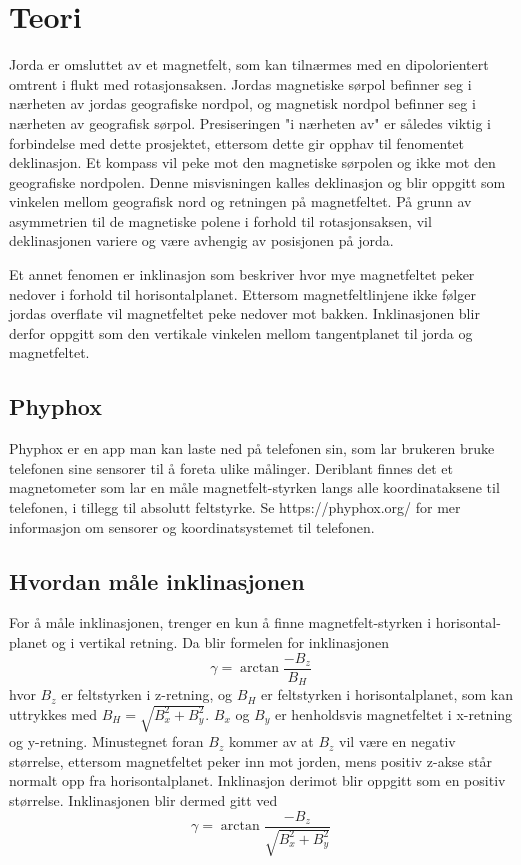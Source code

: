 \section{Teori}
Jorda er omsluttet av et magnetfelt, som kan tilnærmes med en 
dipolorientert omtrent i flukt med rotasjonsaksen. Jordas magnetiske sørpol 
befinner seg i nærheten av jordas geografiske nordpol, og magnetisk nordpol 
befinner seg i nærheten av geografisk sørpol. Presiseringen "i nærheten av" 
er således viktig i forbindelse med dette prosjektet, ettersom dette gir 
opphav til fenomentet deklinasjon. Et kompass vil peke mot den magnetiske sørpolen og ikke mot den geografiske nordpolen.
Denne misvisningen kalles deklinasjon og blir oppgitt som vinkelen mellom 
geografisk nord og retningen på magnetfeltet. På grunn av asymmetrien til 
de magnetiske polene i forhold til rotasjonsaksen, vil deklinasjonen 
variere og være avhengig av posisjonen på jorda. \cite{World_magnetic_model}

Et annet fenomen er inklinasjon som beskriver hvor mye magnetfeltet peker 
nedover i forhold til horisontalplanet. Ettersom magnetfeltlinjene ikke følger jordas overflate vil 
magnetfeltet peke nedover mot bakken. Inklinasjonen 
blir derfor oppgitt som den vertikale vinkelen mellom tangentplanet til jorda og
magnetfeltet.

\subsection{Phyphox}
Phyphox er en app man kan laste ned på telefonen sin, som lar brukeren 
bruke telefonen sine sensorer til å foreta ulike målinger. Deriblant finnes 
det et magnetometer som lar en måle magnetfelt-styrken langs alle 
koordinataksene til telefonen, i tillegg til absolutt feltstyrke. 
Se https://phyphox.org/ \cite{phyphox} for mer informasjon om sensorer og koordinatsystemet til telefonen.

\subsection{Hvordan måle inklinasjonen}
For å måle inklinasjonen, trenger en kun å finne magnetfelt-styrken i horisontal-
planet og i vertikal retning. Da blir formelen for inklinasjonen 
\begin{equation}
    \gamma = \arctan \frac{-B_z}{B_H} 
\end{equation}
hvor $B_z$ er feltstyrken i z-retning, og $B_H$ er feltstyrken i horisontalplanet, som kan 
uttrykkes med $B_H = \sqrt{B_x^2 + B_y^2}$. $B_x$ og $B_y$ er henholdsvis magnetfeltet i x-retning
og y-retning.
Minustegnet foran $B_z$ kommer av at $B_z$ vil være en negativ størrelse, ettersom magnetfeltet peker inn mot 
jorden, mens 
positiv z-akse står normalt opp fra horisontalplanet. Inklinasjon derimot blir oppgitt 
som en positiv størrelse.
Inklinasjonen blir dermed gitt ved
\begin{equation}
    \label{eq:inclination}
    \gamma = \arctan{ \frac{-B_z}{\sqrt{B_x^2 + B_y^2}} }
\end{equation}

